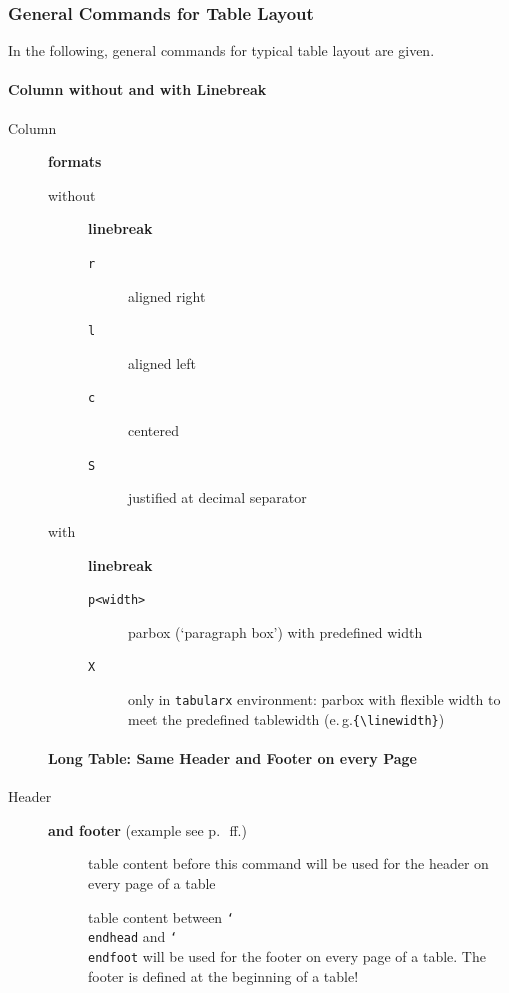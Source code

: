 \documentclass{pharmrep}
\makeatletter
\DeclareRobustCommand\meta[1]{%
   \ensuremath\langle
   \ifmmode \expandafter \nfss@text \fi
   {%
      \meta@font@select
      \edef\meta@hyphen@restore
      {\hyphenchar\the\font\the\hyphenchar\font}%
      \hyphenchar\font\m@ne
      \language\l@nohyphenation
      #1\/%
      \meta@hyphen@restore
   }\ensuremath\rangle
}
\DeclareRobustCommand\cs[1]{\texttt{\char`\\#1}}
\providecommand\oarg[1]{%
   {\ttfamily[}\meta{#1}{\ttfamily]}}
\def\meta@font@select{\itshape}
\newcommand{\env}[1]{\texttt{#1}}
\newcommand{\eg}{e.\,g.\xspace}
\makeatother
\begin{document}
\bigskip

\subsubsection{General Commands for Table Layout}
In the following, general commands for typical table layout are given.

\paragraph{Column without and with Linebreak}
\begin{description}
   \item[Column] \textbf{formats}
   \begin{description}
      \item[without] \textbf{linebreak}
      \begin{description}
         \item[\texttt{r}] aligned right
         \item[\texttt{l}] aligned left
         \item[\texttt{c}] centered
         \item[\texttt{S}] justified at decimal separator
      \end{description}
      \item[with] \textbf{linebreak}
      \begin{description}
         \item[\texttt{p{<width>}}] parbox (`paragraph box') with predefined width
         \item[\texttt{X}] only in \env{tabularx} environment: parbox with flexible width to meet
         the predefined tablewidth (\eg \verb|{\linewidth}|)
      \end{description}
   \end{description}

   \paragraph{Long Table: Same Header and Footer on every Page}
   \item[Header] \textbf{and footer} (example see p.~\pageref{subsubsec:longtables}\,ff.)
   \begin{description}
      \item[\cs{endhead\oarg{optional argument}}] table content before this command
      will
      be used for the header on every page of a table
      \item[\cs{endfoot\oarg{optional argument}}] table content between
      \cs{endhead} and \cs{endfoot} will be used for the footer on
      every page of a table. The footer is defined at the beginning of a table!
   \end{description}


\end{description}
\end{document}
